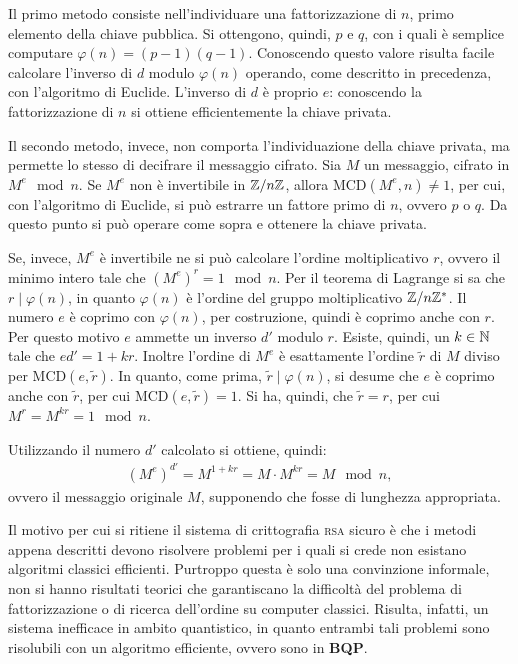 Il primo metodo consiste nell'individuare una fattorizzazione di $n$, primo elemento della chiave pubblica.
Si ottengono, quindi, $p$ e $q$, con i quali è semplice computare $\varphi(n) = (p-1)(q-1)$.
Conoscendo questo valore risulta facile calcolare l'inverso di $d$ modulo $\varphi(n)$ operando, come descritto in precedenza, con l'algoritmo di Euclide.
L'inverso di $d$ è proprio $e$: conoscendo la fattorizzazione di $n$ si ottiene efficientemente la chiave privata.

Il secondo metodo, invece, non comporta l'individuazione della chiave privata, ma permette lo stesso di decifrare il messaggio cifrato.
Sia $M$ un messaggio, cifrato in $M^{e} \mod n$.
Se $M^e$ non è invertibile in $\mathbb{Z}/{n}\mathbb{Z}$, allora MCD$(M^e,n) \neq 1$, per cui, con l'algoritmo di Euclide, si può estrarre un fattore primo di $n$, ovvero $p$ o $q$.
Da questo punto si può operare come sopra e ottenere la chiave privata.

Se, invece, $M^e$ è invertibile ne si può calcolare l'ordine moltiplicativo $r$, ovvero il minimo intero tale che $\left(M^e\right)^r = 1 \mod n$.
Per il teorema di Lagrange si sa che $r \mid \varphi(n)$, in quanto $\varphi(n)$ è l'ordine del gruppo moltiplicativo $\mathbb{Z}/{n}\mathbb{Z}^*$.
Il numero $e$ è coprimo con $\varphi(n)$, per costruzione, quindi è coprimo anche con $r$.
Per questo motivo $e$ ammette un inverso $d'$ modulo $r$.
Esiste, quindi, un $k \in \mathbb{N}$ tale che $ed' = 1 + kr$.
Inoltre l'ordine di $M^e$ è esattamente l'ordine $\tilde{r}$ di $M$ diviso per MCD$(e,\tilde{r})$.
In quanto, come prima, $\tilde{r} \mid \varphi(n)$, si desume che $e$ è coprimo anche con $\tilde{r}$, per cui MCD$(e,\tilde{r}) = 1$.
Si ha, quindi, che $\tilde{r} = r$, per cui $M^r = M^{kr} = 1 \mod n$.

Utilizzando il numero $d'$ calcolato si ottiene, quindi:
\begin{align}
 \left(M^e\right)^{d'} = M^{1+kr} = M \cdot M^{kr} = M \mod n,
\end{align}
ovvero il messaggio originale $M$, supponendo che fosse di lunghezza appropriata.

Il motivo per cui si ritiene il sistema di crittografia \textsc{rsa} sicuro è che i metodi appena descritti devono risolvere problemi per i quali si crede non esistano algoritmi classici efficienti.
Purtroppo questa è solo una convinzione informale, non si hanno risultati teorici che garantiscano la difficoltà del problema di fattorizzazione o di ricerca dell'ordine su computer classici.
Risulta, infatti, un sistema inefficace in ambito quantistico, in quanto entrambi tali problemi sono risolubili con un algoritmo efficiente, ovvero sono in \textbf{BQP}.

